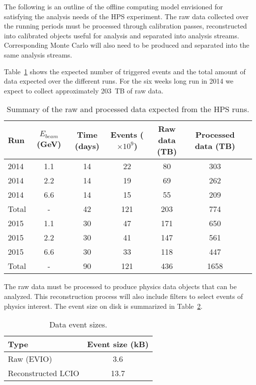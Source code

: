 
The following is an outline of the offline computing model envisioned for satisfying the analysis needs of the HPS experiment. The raw data collected over the running periods must be processed through calibration passes, reconstructed into calibrated objects useful for analysis and separated into analysis streams. Corresponding Monte Carlo will also need to be produced and separated into the same analysis streams.

Table~\ref{tab:data_rates} shows the expected number of triggered events and
the total amount of data expected over the 
different runs. For the six weeks long run in 2014 we expect to collect approximately 203~TB of raw data.
\begin{table}[]
\centering
\begin{tabular}{|l|c|c|c|c|c|c|}
\hline
Run & $E_{beam}$ (GeV) & Time (days) & Events ($\times 10^9$) & Raw data (TB) & Processed data (TB)\\
\hline
2014 & 1.1 & 14 & 22 & 80 & 303 \\
2014 & 2.2 & 14 & 19 & 69 & 262  \\
2014 & 6.6 & 14 & 15 & 55 & 209  \\
\hline
Total & - & 42 & 121 & 203  & 774 \\
\hline
2015 & 1.1 & 30 & 47 & 171 & 650 \\
2015 & 2.2 & 30 & 41 & 147 & 561 \\
2015 & 6.6 & 30 & 33 & 118 & 447 \\
\hline
Total & - & 90 & 121 & 436 & 1658 \\
\hline
\end{tabular}
\caption{{\small Summary of the raw and processed data expected from the HPS runs. }}
\label{tab:data_rates}
\end{table}
The raw data must be processed to produce physics data objects that can be analyzed. This reconstruction process will also include filters to select events of physics interest. The event size on disk is summarized 
in Table~\ref{tab:raw_data_size}. 
\begin{table}[]
\centering
\begin{tabular}{|l|c|}
\hline
Type & Event size (kB) \\ 
\hline
Raw (EVIO)  &  3.6 \\
\hline
Reconstructed LCIO & 13.7 \\
\hline
\end{tabular}
\caption{{\small Data event sizes. }}
\label{tab:raw_data_size}
\end{table}

